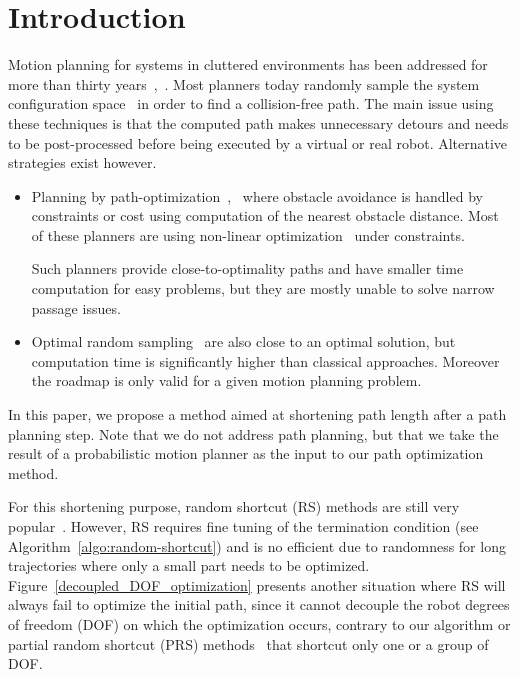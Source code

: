 \documentclass{tADR2e}
\begin{document}
\section{Introduction}

Motion planning for systems in cluttered environments has been addressed for more
than thirty years~\citep{ref-motionplan},~\citep{ref-pianomover}. Most planners
today randomly sample the system configuration space~\cite{ref-spaceconfig} in
order to find a collision-free path. The main issue using these techniques is
 that the computed path makes unnecessary detours and needs to be post-processed 
 before being executed by a virtual or real robot. Alternative
strategies exist however.
\begin{itemize}
\item Planning by path-optimization~\cite{itomp2012},~\cite{voronoiOMP} where
obstacle avoidance is handled by constraints or cost using computation of the
nearest obstacle distance. Most of these planners are using non-linear
optimization~\cite{BettsNonlinopt} under constraints.
   
Such planners provide close-to-optimality paths and have smaller time computation
for easy problems, but they are mostly unable to solve narrow passage issues.
 
\item Optimal random sampling~\cite{KaramanPRMstarRRTstar} are also close to an
optimal solution, but computation time is significantly higher than classical
approaches. Moreover the roadmap is only valid for a given motion planning
   problem. 
\end{itemize}

In this paper, we propose a method aimed at shortening path length after a path
planning step. Note that we do not address path planning, but that we take the
result of a probabilistic motion planner as the input to our path optimization 
method.

For this shortening purpose, random shortcut (RS) methods are
still very 
popular~\cite{Sekhavat-Svestka1998,Geraerts04clearancebased,HauserFastSmooth}. 
However, RS requires fine 
tuning of the termination condition (see 
Algorithm~\ref{algo:random-shortcut}) and is no efficient due to randomness for long 
trajectories where only a small part needs to be optimized. 
Figure~\ref{decoupled_DOF_optimization} presents another situation where RS will 
always fail to optimize the initial path, since it cannot decouple the 
robot degrees of freedom (DOF) on which the optimization occurs, contrary to our 
algorithm or partial random shortcut (PRS) methods~\cite{Geraerts04clearancebased} 
that shortcut only one or a group of DOF.
\end{document}
